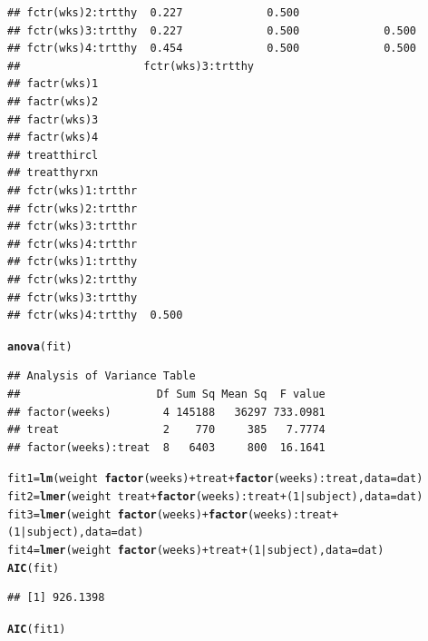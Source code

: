 \documentclass{article}\usepackage[]{graphicx}\usepackage[]{color}
\makeatletter
\newcommand{\hlnum}[1]{\textcolor[rgb]{0.686,0.059,0.569}{#1}}%
\newcommand{\hlopt}[1]{\textcolor[rgb]{0,0,0}{#1}}%
\newcommand{\hlstd}[1]{\textcolor[rgb]{0.345,0.345,0.345}{#1}}%
\newcommand{\hlkwb}[1]{\textcolor[rgb]{0.69,0.353,0.396}{#1}}%
\newcommand{\hlkwc}[1]{\textcolor[rgb]{0.333,0.667,0.333}{#1}}%
\newcommand{\hlkwd}[1]{\textcolor[rgb]{0.737,0.353,0.396}{\textbf{#1}}}%
\newenvironment{kframe}{%
 \def\at@end@of@kframe{}%
 \ifinner\ifhmode%
  \def\at@end@of@kframe{\end{minipage}}%
  \begin{minipage}{\columnwidth}%
 \fi\fi%
 \def\FrameCommand##1{\hskip\@totalleftmargin \hskip-\fboxsep
 \colorbox{shadecolor}{##1}\hskip-\fboxsep
     \hskip-\linewidth \hskip-\@totalleftmargin \hskip\columnwidth}%
 \MakeFramed {\advance\hsize-\width
   \@totalleftmargin\z@ \linewidth\hsize
   \@setminipage}}%
 {\par\unskip\endMakeFramed%
 \at@end@of@kframe}
\newenvironment{knitrout}{}{} %
\makeatother
\begin{document}
\begin{enumerate}[(a)]
\begin{knitrout}
\begin{kframe}
\begin{verbatim}
## fctr(wks)2:trtthy  0.227             0.500                             
## fctr(wks)3:trtthy  0.227             0.500             0.500           
## fctr(wks)4:trtthy  0.454             0.500             0.500           
##                   fctr(wks)3:trtthy
## factr(wks)1                        
## factr(wks)2                        
## factr(wks)3                        
## factr(wks)4                        
## treatthircl                        
## treatthyrxn                        
## fctr(wks)1:trtthr                  
## fctr(wks)2:trtthr                  
## fctr(wks)3:trtthr                  
## fctr(wks)4:trtthr                  
## fctr(wks)1:trtthy                  
## fctr(wks)2:trtthy                  
## fctr(wks)3:trtthy                  
## fctr(wks)4:trtthy  0.500
\end{verbatim}
\begin{alltt}
  \hlkwd{anova}\hlstd{(fit)}
\end{alltt}
\begin{verbatim}
## Analysis of Variance Table
##                     Df Sum Sq Mean Sq  F value
## factor(weeks)        4 145188   36297 733.0981
## treat                2    770     385   7.7774
## factor(weeks):treat  8   6403     800  16.1641
\end{verbatim}
\begin{alltt}
  \hlstd{fit1} \hlkwb{=} \hlkwd{lm}\hlstd{(weight} \hlopt{~} \hlkwd{factor}\hlstd{(weeks)} \hlopt{+} \hlstd{treat} \hlopt{+} \hlkwd{factor}\hlstd{(weeks)}\hlopt{:}\hlstd{treat,} \hlkwc{data} \hlstd{= dat )}
  \hlstd{fit2} \hlkwb{=} \hlkwd{lmer}\hlstd{(weight} \hlopt{~} \hlstd{treat} \hlopt{+} \hlkwd{factor}\hlstd{(weeks)}\hlopt{:}\hlstd{treat} \hlopt{+} \hlstd{(}\hlnum{1}\hlopt{|}\hlstd{subject),} \hlkwc{data} \hlstd{= dat )}
  \hlstd{fit3} \hlkwb{=} \hlkwd{lmer}\hlstd{(weight} \hlopt{~} \hlkwd{factor}\hlstd{(weeks)} \hlopt{+} \hlkwd{factor}\hlstd{(weeks)}\hlopt{:}\hlstd{treat} \hlopt{+} \hlstd{(}\hlnum{1}\hlopt{|}\hlstd{subject),} \hlkwc{data} \hlstd{= dat )}
  \hlstd{fit4} \hlkwb{=} \hlkwd{lmer}\hlstd{(weight} \hlopt{~} \hlkwd{factor}\hlstd{(weeks)} \hlopt{+} \hlstd{treat} \hlopt{+} \hlstd{(}\hlnum{1}\hlopt{|}\hlstd{subject),} \hlkwc{data} \hlstd{= dat )}
  \hlkwd{AIC}\hlstd{(fit)}
\end{alltt}
\begin{verbatim}
## [1] 926.1398
\end{verbatim}
\begin{alltt}
  \hlkwd{AIC}\hlstd{(fit1)}
\end{alltt}
\begin{verbatim}

\end{verbatim}
\end{kframe}
\end{knitrout}
\end{enumerate}
\end{document}
